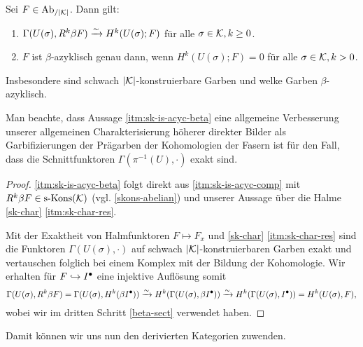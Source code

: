 \begin{prop}[\cite{KS}, 8.1.8] \label{sk-is-acyc}
  Sei $F \in \operatorname{Ab}_{/|\mathcal{K}|}$. Dann gilt:
  \begin{enumerate}[label=(\roman*)]
  \item \label{itm:sk-is-acyc-comp} $\Gamma(U(\sigma), R^k\beta F)
    \xrightarrow[]{\sim} H^k(U(\sigma); F)$ für alle $\sigma \in \mathcal{K}, k \geq 0$.
  \item \label{itm:sk-is-acyc-beta} $F$ ist $\beta$-azyklisch genau dann,
    wenn $H^k(U(\sigma); F) = 0$ für alle $\sigma \in \mathcal{K}, k > 0$.
  \end{enumerate}
  Insbesondere sind schwach $|\mathcal{K}|$-konstruierbare Garben und welke
  Garben $\beta$-azyklisch.
\end{prop}
\begin{bem}
  Man beachte, dass Aussage \ref{itm:sk-is-acyc-beta} eine allgemeine
  Verbesserung unserer allgemeinen Charakterisierung höherer direkter
  Bilder als Garbifizierungen der Prägarben der Kohomologien der
  Fasern ist für den Fall, dass die Schnittfunktoren
  $\Gamma(\pi^{-1}(U), \cdot)$ exakt sind.
\end{bem}
\begin{proof}
  \ref{itm:sk-is-acyc-beta} folgt direkt aus \ref{itm:sk-is-acyc-comp} mit
  $R^k\beta F \in \operatorname{s-Kons}(\mathcal{K})$ (vgl. \ref{skons-abelian}) und unserer
  Aussage über die Halme \ref{sk-char} \ref{itm:sk-char-res}.
  
  Mit der Exaktheit von Halmfunktoren $F \mapsto F_x$ und
  \ref{sk-char} \ref{itm:sk-char-res} sind die Funktoren
  $\Gamma(U(\sigma), \cdot)$ auf schwach $|\mathcal{K}|$-konstruierbaren Garben
  exakt und vertauschen folglich bei einem Komplex mit der Bildung der
  Kohomologie. Wir erhalten für $F \hookrightarrow I^{\bullet}$ eine injektive Auflösung
  somit
  \[ \Gamma(U(\sigma), R^k\beta F)
  = \Gamma(U(\sigma), H^k(\beta I^{\bullet}))
  \xrightarrow[]{\sim} H^k(\Gamma(U(\sigma), \beta I^{\bullet}))
  \xrightarrow[]{\sim} H^k(\Gamma(U(\sigma), I^{\bullet}))
  = H^k(U(\sigma), F), \]
  wobei wir im dritten Schritt \ref{beta-sect} verwendet haben.
\end{proof}

Damit können wir uns nun den derivierten Kategorien zuwenden.

